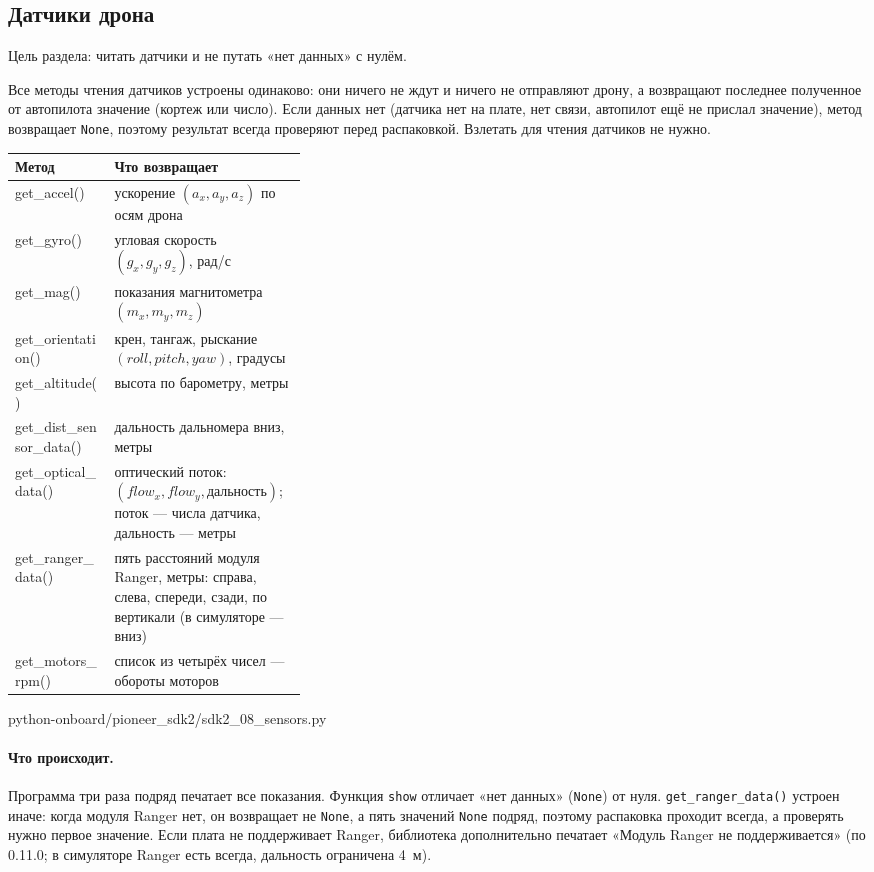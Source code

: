 \subsection{Датчики дрона}

Цель раздела: читать датчики и не путать «нет данных» с нулём.

Все методы чтения датчиков устроены одинаково: они ничего не ждут и ничего не отправляют дрону, а возвращают последнее полученное от автопилота значение (кортеж или число). Если данных нет (датчика нет на плате, нет связи, автопилот ещё не прислал значение), метод возвращает \verb|None|, поэтому результат всегда проверяют перед распаковкой. Взлетать для чтения датчиков не нужно.

\begin{center}
\small
\begin{tabularx}{\linewidth}{@{}>{\ttfamily\raggedright\arraybackslash}p{0.34\linewidth} X@{}}
\toprule
\textrm{\textbf{Метод}} & \textbf{Что возвращает} \\
\midrule
get\_accel() & ускорение $(a_x, a_y, a_z)$ по осям дрона \\
get\_gyro() & угловая скорость $(g_x, g_y, g_z)$, рад/с \\
get\_mag() & показания магнитометра $(m_x, m_y, m_z)$ \\
get\_orientation() & крен, тангаж, рыскание $(roll, pitch, yaw)$, градусы \\
get\_altitude() & высота по барометру, метры \\
get\_dist\_sensor\_data() & дальность дальномера вниз, метры \\
get\_optical\_data() & оптический поток: $(flow_x, flow_y, дальность)$; поток --- числа датчика, дальность --- метры \\
get\_ranger\_data() & пять расстояний модуля Ranger, метры: справа, слева, спереди, сзади, по вертикали (в симуляторе --- вниз) \\
get\_motors\_rpm() & список из четырёх чисел --- обороты моторов \\
\bottomrule
\end{tabularx}
\end{center}

\begin{codefile}[python]{python-onboard/pioneer_sdk2/sdk2_08_sensors.py}
\end{codefile}

\paragraph{Что происходит.} Программа три раза подряд печатает все показания. Функция \verb|show| отличает «нет данных» (\verb|None|) от нуля. \verb|get_ranger_data()| устроен иначе: когда модуля Ranger нет, он возвращает не \verb|None|, а пять значений \verb|None| подряд, поэтому распаковка проходит всегда, а проверять нужно первое значение. Если плата не поддерживает Ranger, библиотека дополнительно печатает «Модуль Ranger не поддерживается» (по 0.11.0; в симуляторе Ranger есть всегда, дальность ограничена 4~м).

